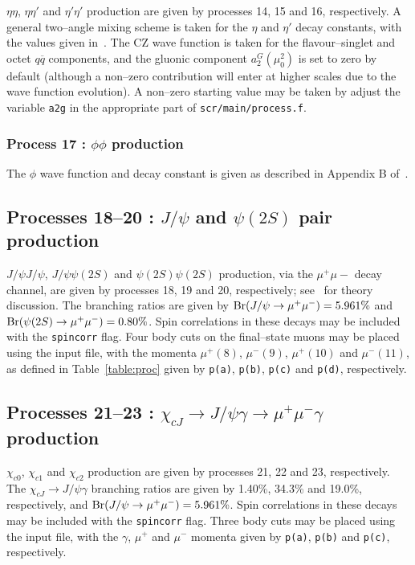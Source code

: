 \documentclass[12pt]{article}
\begin{document}
$\eta\eta$, $\eta\eta'$ and $\eta'\eta'$ production are given by processes 14, 15 and 16, respectively. A general two--angle mixing scheme is taken for the $\eta$ and $\eta'$ decay constants, with the values given in~\cite{Harland-Lang:2013ncy}. The CZ wave function is taken for the flavour--singlet and octet $q\overline{q}$ components, and the gluonic component $a_2^G(\mu_0^2)$ is set to zero by default (although a non--zero contribution will enter at higher scales due to the wave function evolution). A non--zero starting value may be taken by adjust the variable \texttt{a2g} in the appropriate part of \texttt{scr/main/process.f}.

\subsubsection{Process 17 : $\phi\phi$ production}

The $\phi$ wave function and decay constant is given as described in Appendix B of~\cite{Harland-Lang:2014efa}.

\subsection{Processes 18--20 : $J/\psi$ and $\psi(2S)$ pair production}

$J/\psi J/\psi$, $J/\psi\psi(2S)$ and $\psi(2S)\psi(2S)$ production, via the $\mu^+\mu-$ decay channel, are given by processes 18, 19 and 20, respectively; see~\cite{Harland-Lang:2014efa} for theory discussion. The branching ratios are given by ${\rm Br}(J/\psi \to \mu^+\mu^-)=5.961\%$ and ${\rm Br}(\psi(2S) \to \mu^+\mu^-)=0.80\%$. Spin correlations in these decays may be included with the \texttt{spincorr} flag. Four body cuts on the final--state muons may be placed using the input file, with the momenta $\mu^+(8)$, $\mu^-(9)$, $\mu^+(10)$ and $\mu^-(11)$, as defined in Table~\ref{table:proc} given by \texttt{p(a)}, \texttt{p(b)}, \texttt{p(c)} and \texttt{p(d)}, respectively.

\subsection{Processes 21--23 : $\chi_{cJ}\to J/\psi\gamma\to \mu^+\mu^-\gamma$ production}

$\chi_{c0}$, $\chi_{c1}$ and $\chi_{c2}$ production are given by processes 21, 22 and 23, respectively. The $\chi_{cJ}\to J/\psi \gamma$ branching ratios are given by 1.40\%, 34.3\% and 19.0\%, respectively, and ${\rm Br}(J/\psi \to \mu^+\mu^-)=5.961\%$. Spin correlations in these decays may be included with the \texttt{spincorr} flag. Three body cuts may be placed using the input file, with the $\gamma$, $\mu^+$ and $\mu^-$ momenta given by \texttt{p(a)}, \texttt{p(b)} and \texttt{p(c)}, respectively.
\end{document}
